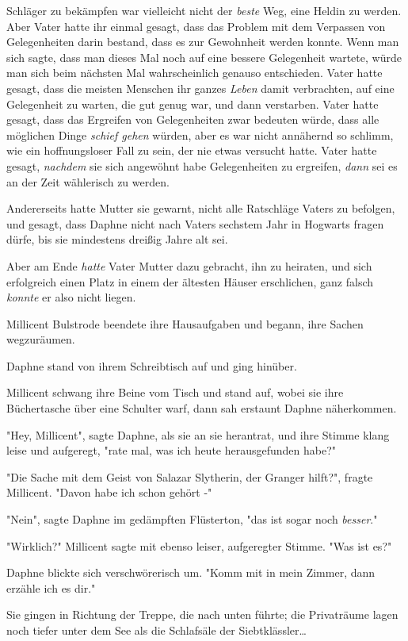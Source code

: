 {Schläger zu bekämpfen war vielleicht nicht der \emph{beste} Weg, eine Heldin zu werden. Aber Vater hatte ihr einmal gesagt, dass das Problem mit dem Verpassen von Gelegenheiten darin bestand, dass es zur Gewohnheit werden konnte. Wenn man sich sagte, dass man dieses Mal noch auf eine bessere Gelegenheit wartete, würde man sich beim nächsten Mal wahrscheinlich genauso entschieden. Vater hatte gesagt, dass die meisten Menschen ihr ganzes \emph{Leben} damit verbrachten, auf eine Gelegenheit zu warten, die gut genug war, und dann verstarben. Vater hatte gesagt, dass das Ergreifen von Gelegenheiten zwar bedeuten würde, dass alle möglichen Dinge \emph{schief gehen} würden, aber es war nicht annähernd so schlimm, wie ein hoffnungsloser Fall zu sein, der nie etwas versucht hatte. Vater hatte gesagt, \emph{nachdem} sie sich angewöhnt habe Gelegenheiten zu ergreifen, \emph{dann} sei es an der Zeit wählerisch zu werden.

Andererseits hatte Mutter sie gewarnt, nicht alle Ratschläge Vaters zu befolgen, und gesagt, dass Daphne nicht nach Vaters sechstem Jahr in Hogwarts fragen dürfe, bis sie mindestens dreißig Jahre alt sei.

Aber am Ende \emph{hatte} Vater Mutter dazu gebracht, ihn zu heiraten, und sich erfolgreich einen Platz in einem der ältesten Häuser erschlichen, ganz falsch \emph{konnte} er also nicht liegen.

Millicent Bulstrode beendete ihre Hausaufgaben und begann, ihre Sachen wegzuräumen.

Daphne stand von ihrem Schreibtisch auf und ging hinüber.

Millicent schwang ihre Beine vom Tisch und stand auf, wobei sie ihre Büchertasche über eine Schulter warf, dann sah erstaunt Daphne näherkommen.

"Hey, Millicent", sagte Daphne, als sie an sie herantrat, und ihre Stimme klang leise und aufgeregt, "rate mal, was ich heute herausgefunden habe?"

"Die Sache mit dem Geist von Salazar Slytherin, der Granger hilft?", fragte Millicent. "Davon habe ich schon gehört -"

"Nein", sagte Daphne im gedämpften Flüsterton, "das ist sogar noch \emph{besser}."

"Wirklich?" Millicent sagte mit ebenso leiser, aufgeregter Stimme. "Was ist es?"

Daphne blickte sich verschwörerisch um. "Komm mit in mein Zimmer, dann erzähle ich es dir."

Sie gingen in Richtung der Treppe, die nach unten führte; die Privaträume lagen noch tiefer unter dem See als die Schlafsäle der Siebtklässler…

}
